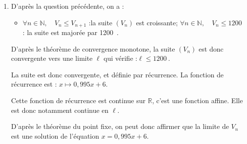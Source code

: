 \documentclass[10pt]{article}
\providecommand{\R}{\mathbb{R}}
\providecommand{\N}{\mathbb{N}}
\providecommand{\np}[2][]{{#2~#1}}
\begin{document}
\begin{enumerate}
\begin{itemize}
		On constate donc que l'inégalité $I_0$ est vraie.

		\item \textbf{Hérédité :} Pour un entier $n$ naturel donné, si l'inégalité $I_n$ est vraie, on a :

		$\begin{aligned}
			V_n \leqslant V_{n+1} \leqslant \np{1200}
				&\implies 0,995V_n \leqslant 0,995V_{n+1} \leqslant 0,995 \times \np{1200} \quad \text{car } 0,995 > 0\\
				&\implies 0,995V_n \leqslant 0,995V_{n+1} \leqslant \np{1194}\\
				&\implies 0,995V_n +6 \leqslant 0,995V_{n+1} +6\leqslant \np{1194}+6\\
				&\implies V_{n + 1} \leqslant V_{n + 2} \leqslant \np{1200}\\
		\end{aligned}$

		Autrement dit, l'inégalité $I_n$ implique l'inégalité $I_{n+1}$.
		\item \textbf{Conclusion :} L'inégalité est vraie pour $n = 0$ et si une inégalité est vraie au rang $n$, alors la suivante (au rang $n+1$) l'est aussi.

		D'après le principe de récurrence, on peut en déduire que, pour tout entier naturel $n$, l'inégalité $I_n$ est vraie.

		$\forall n \in \N,\quad V_n \leqslant V_{n+1} \leqslant \np{1200}$.
	\end{itemize}

	\item D'après la question précédente, on a :
	\begin{itemize}
		\item $\forall n \in \N,\quad V_n \leqslant V_{n+1}$ :\quad  la suite $(V_n)$ est croissante;
		$\forall n \in \N,\quad V_n \leqslant \np{1200}$ : \quad la suite est majorée par \np{1200}.
	\end{itemize}

	D'après le théorème de convergence monotone, la suite $(V_n)$ est donc convergente vers une limite $\ell$ qui vérifie :\quad $\ell \leqslant \np{1200}$.

	La suite est donc convergente, et définie par récurrence. La fonction de récurrence est : \quad $x \longmapsto 0,995x + 6$.

	Cette fonction de récurrence est continue sur $\R$, c'est une fonction affine. Elle est donc notamment continue en $\ell$.

	D'après le théorème du point fixe, on peut donc affirmer que la limite de $V_n$ est une solution de l'équation $x = 0,995x + 6$.


\end{enumerate}
\end{document}
